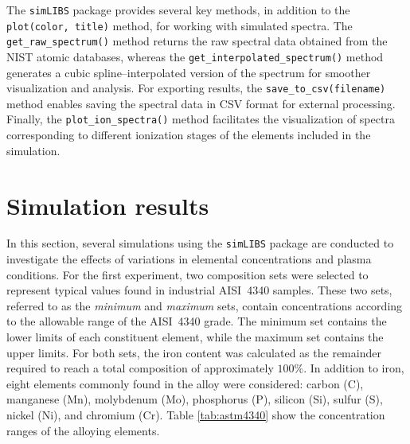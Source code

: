 \documentclass[12pt,a4paper]{article}
\begin{document}
		The \texttt{simLIBS} package provides several key methods, in addition to the \texttt{plot(color, title)} method, for working with simulated spectra. 
		The \texttt{get\_raw\_spectrum()} method returns the raw spectral data obtained from the NIST atomic 
		databases, whereas the \texttt{get\_interpolated\_spectrum()} method generates a cubic spline--interpolated 
		version of the spectrum for smoother visualization and analysis. 
		For exporting results, the \texttt{save\_to\_csv(filename)} method enables saving the spectral data 
		in CSV format for external processing. 
		Finally, the \texttt{plot\_ion\_spectra()} method facilitates the visualization of spectra corresponding 
		to different ionization stages of the elements included in the simulation.
		
	\section{Simulation results}
	In this section, several simulations using the \texttt{simLIBS} package are conducted to investigate the effects of variations in elemental concentrations and plasma conditions. For the first experiment, two composition sets were selected to represent typical values found in industrial AISI~4340 samples. These two sets, referred to as the \emph{minimum} and \emph{maximum} sets, contain concentrations according to the allowable range of the AISI~4340 grade. The minimum set contains the lower limits of each constituent element, while the maximum set contains the upper limits. For both sets, the iron content was calculated as the remainder required to reach a total composition of approximately $100\%$. In addition to iron, eight elements commonly found in the alloy were considered: carbon (C), manganese (Mn), molybdenum (Mo), phosphorus (P), silicon (Si), sulfur (S), nickel (Ni), and chromium (Cr). Table \ref{tab:astm4340} show the concentration ranges of the alloying elements.
	\begin{table}[htbp]
		\centering
		\caption{ASTM 4340 Steel – Chemical Composition}
		\label{tab:astm4340}
	\end{table}
	
\end{document}
